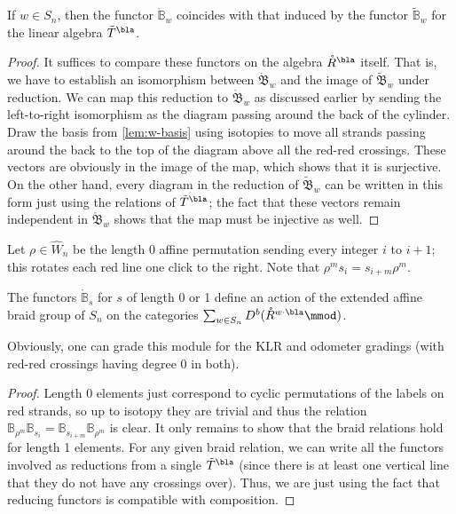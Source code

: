 \begin{proposition}\label{prop:ring-reduce}
If $w\in S_n$, then the functor $\mathring{\mathbb{B}}_w$ coincides with that induced by the functor $\tilde{\mathbb{B}}_w$ for the linear algebra $\tilde{T}^\bla$.
\end{proposition}
\begin{proof}
It suffices to compare these functors on the algebra $\mathring{R}^\bla$ itself.  That is, we have to establish an isomorphism between $\mathring{\mathfrak{B}}_w$ and the image of $\tilde {\mathfrak{B}}_w$ under reduction.  We can map this reduction to $\mathring{\mathfrak{B}}_w$ as discussed earlier by sending the left-to-right isomorphism as the diagram passing around the back of the cylinder. Draw the basis from \ref{lem:w-basis} using  isotopies to move all strands passing around the back to the top of the diagram above all the red-red crossings. These vectors are obviously in the image of the map, which shows that it is surjective.  On the other hand, every diagram in the reduction of $\tilde {\mathfrak{B}}_w$ can be written in this form just using the relations of $\tilde{T}^\bla$; the fact that these vectors remain independent in $\mathring{\mathfrak{B}}_w$ shows that the map must be injective as well.
\end{proof}

Let $\rho\in \hat{W}_n$ be the length 0 affine permutation sending every integer $i$ to $i+1$;  this rotates each red line one click to the right.  Note that $\rho^m s_i=s_{i+m}\rho^m$.  
\begin{theorem}\label{thm:B-braid-action}
 The functors $\mathbb{\mathring{B}}_{s}$ for $s$ of length 0 or 1 define an action of the extended affine braid group of $S_n$ on the categories $\sum_{w\in S_n}D^b(\mathring{R}^{w\cdot \bla}\mmod)$.
\end{theorem}
Obviously, one can grade this module for the KLR and odometer gradings (with red-red crossings having degree 0 in both).  
\begin{proof}
Length 0 elements just correspond to cyclic permutations of the labels on red strands, so up to isotopy they are trivial and thus the relation $\mathbb{B}_{\rho^m}  \mathbb{B}_{s_i}=\mathbb{B}_{s_{i+m}} \mathbb{B}_{\rho^m}$ is clear.   It only remains to show that the braid relations hold for length 1 elements.  For any given braid relation, we can write all the functors involved as reductions from a single $\tilde{T}^{\bla}$ (since there is at least one vertical line that they do not have any crossings over).  Thus, we are just using the fact that  reducing functors is compatible with composition.
\end{proof}


